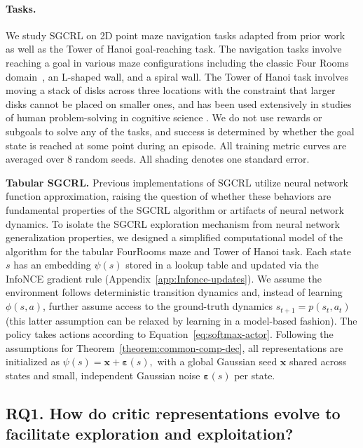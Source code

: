 \documentclass{article}
\begin{document}
\paragraph{Tasks.}
We study SGCRL on 2D point maze navigation tasks adapted from prior work~\citep{eysenbach2022contrastive, liu2025a} as well as the Tower of Hanoi goal-reaching task. The navigation tasks involve reaching a goal in various maze configurations including the classic Four Rooms domain~\citep{sutton1999between}, an L-shaped wall, and a spiral wall. The Tower of Hanoi task involves moving a stack of disks across three locations with the constraint that larger disks cannot be placed on smaller ones, and has been used extensively in studies of human problem-solving in cognitive science \citep{simon1975functional}. We do not use rewards or subgoals to solve any of the tasks, and success is determined by whether the goal state is reached at some point during an episode. All training metric curves are averaged over 8 random seeds. All shading denotes one standard error.

\textbf{Tabular SGCRL.} Previous implementations of SGCRL utilize neural network function approximation, raising the question of whether these behaviors are fundamental properties of the SGCRL algorithm or artifacts of neural network dynamics. To isolate the SGCRL exploration mechanism from neural network generalization properties, we designed a simplified computational model of the algorithm for the tabular FourRooms maze and Tower of Hanoi task. Each state $s$ has an embedding $\psi(s)$ stored in a lookup table and updated via the InfoNCE gradient rule (Appendix~\ref{app:Infonce-updates}). We assume the environment follows deterministic transition dynamics and, instead of learning $\phi(s,a)$, further assume access to the ground-truth dynamics $s_{t+1} = p(s_t, a_t)$ (this latter assumption can be relaxed by learning in a model-based fashion). The policy takes actions according to Equation~\ref{eq:softmax-actor}.
Following the assumptions for Theorem~\ref{theorem:common-comp-dec}, all representations are initialized as
\(
\psi(s)=\mathbf{x}+\boldsymbol{\varepsilon}(s),
\)
with a global Gaussian seed $\mathbf{x}$ shared across states and small, independent Gaussian noise $\boldsymbol{\varepsilon}(s)$ per state.

\subsection{RQ1. How do critic representations evolve to facilitate exploration and exploitation?}\label{subsec:critic} 
\end{document}
